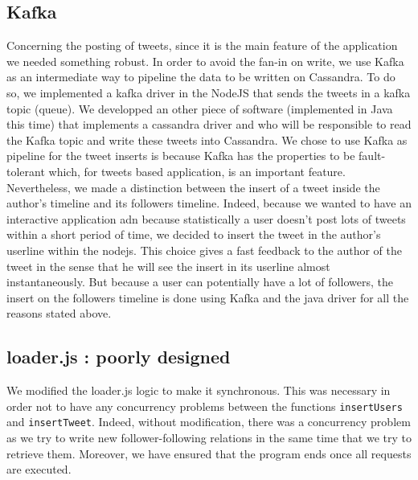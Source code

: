 \documentclass[conference,9pt]{IEEEtran}
\begin{document}
\subsection{Kafka}
Concerning the posting of tweets, since it is the main feature of the application we needed something robust. In order to avoid the fan-in on write, we use Kafka as an intermediate way to pipeline the data to be written on Cassandra. To do so, we implemented a kafka driver in the NodeJS that sends the tweets in a kafka topic (queue). We developped an other piece of software (implemented in Java this time) that implements a cassandra driver and who will be responsible to read the Kafka topic and write these tweets into Cassandra.
We chose to use Kafka as pipeline for the tweet inserts is because Kafka has the properties to be fault-tolerant which, for tweets based application, is an important feature. 
%
Nevertheless, we made a distinction between the insert of a tweet inside the author's timeline and its followers timeline. Indeed, because we wanted to have an interactive application adn because statistically a user doesn't post lots of tweets within a short period of time, we decided to insert the tweet in the author's userline within the nodejs. This choice gives a fast feedback to the author of the tweet in the sense that he will see the insert in its userline almost instantaneously. But because a user can potentially have a lot of followers, the insert on the followers timeline is done using Kafka and the java driver for all the reasons stated above. 

\subsection{loader.js : poorly designed}
We modified the loader.js logic to make it synchronous. This was necessary in order not to have any concurrency problems between the functions \texttt{insertUsers} and \texttt{insertTweet}. Indeed, without modification, there was a concurrency problem as we try to write new follower-following relations in the same time that we try to retrieve them. Moreover, we have ensured that the program ends once all requests are executed.
\end{document}
